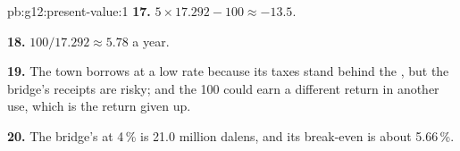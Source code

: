 \begin{solution}{pb:g12:present-value:1}
\textbf{17.} $5 \times 17.292 - 100 \approx -13.5$.

\textbf{18.} $100/17.292 \approx 5.78$ a year.

\textbf{19.} The town borrows at a low rate because its taxes stand behind the , but the bridge's receipts are risky; and the 100 could earn a different return in
another use, which is the return given up.

\textbf{20.} The bridge's  at 4\,\% is 21.0 million dalens, and its break-even  is about 5.66\,\%.
\end{solution}
